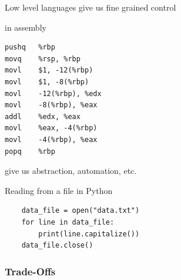 \begin{frame}[fragile]

    Low level languages give us fine grained control 
    
    \Eg {} in assembly

    {\small
    \begin{verbatim}
pushq   %rbp
movq    %rsp, %rbp
movl    $1, -12(%rbp)
movl    $1, -8(%rbp)
movl    -12(%rbp), %edx
movl    -8(%rbp), %eax
addl    %edx, %eax
movl    %eax, -4(%rbp)
movl    -4(%rbp), %eax
popq    %rbp
    \end{verbatim}
    }



\end{frame}


\begin{frame}
    
     give us abstraction, automation, etc.

\end{frame}



\begin{frame}[fragile]

    \Eg Reading from a file in Python
    
    \begin{verbatim}
    data_file = open("data.txt")
    for line in data_file:
        print(line.capitalize()) 
    data_file.close()
    \end{verbatim}

\end{frame}


\begin{frame}
    \frametitle{Trade-Offs}

    \begin{figure}
       \begin{center}
       \end{center}
    \end{figure}

\end{frame}



